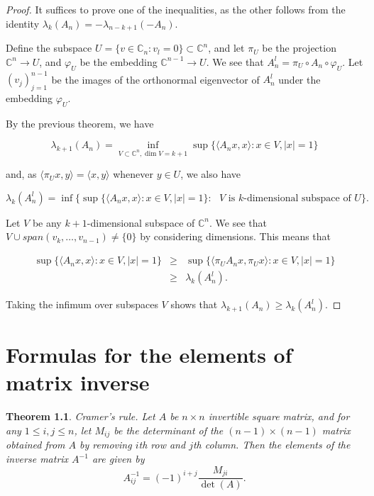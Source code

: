 \documentclass[12pt,a4paper,leqno]{report}
\newcommand{\C}{\mathbb{C}}
\theoremstyle{plain}
\newtheorem{theo}[equation]{Theorem}
\theoremstyle{definition}
\theoremstyle{remark}
\begin{document}
\begin{proof}
It suffices to prove one of the inequalities, as the other follows from the identity $\lambda_k(A_n) = -\lambda_{n-k+1}(-A_n)$.

Define the subspace $U = \{v \in \C_n : v_l=0\} \subset \C^n$, and let $\pi_U$ be the projection $\C^n \to U$, and $\varphi_U$ be the embedding $\C^{n-1} \to U$. We see that $A_n^l = \pi_U \circ A_n \circ \varphi_U$. Let $(v_j)_{j=1}^{n-1}$ be the images of the orthonormal eigenvector of $A_n^l$ under the embedding $\varphi_U$. 

By the previous theorem, we have

\begin{equation*}
\lambda_{k+1}(A_n) = \inf_{V \subset \C^n, \dim V = k+1}  \sup\{\langle A_nx,x \rangle : x \in V, |x|=1\}
\end{equation*}

and, as $\langle \pi_Ux,y \rangle = \langle x,y \rangle$ whenever $y \in U$, we also have

\begin{equation*}
\lambda_k(A_n^l) = \inf \{ \sup\{\langle A_nx,x \rangle : x \in V, |x|=1\} : \textrm{ $V$ is $k$-dimensional subspace of $U$} \}.
\end{equation*}

Let $V$ be any $k+1$-dimensional subspace of $\C^n$. We see that $V \cup span(v_k,\ldots ,v_{n-1}) \neq \{0\}$ by considering dimensions. This means that

\begin{eqnarray*}
\sup\{\langle A_nx,x \rangle : x \in V, |x|=1\} & \geq & \sup\{\langle \pi_UA_nx,\pi_Ux \rangle : x \in V, |x|=1\}\\
& \geq & \lambda_k(A_n^l).
\end{eqnarray*}

Taking the infimum over subspaces $V$ shows that  $\lambda_{k+1}(A_n) \geq \lambda_k(A_n^l)$.

\end{proof}

\chapter{Formulas for the elements of matrix inverse}

\begin{theo}
Cramer's rule. Let $A$ be $n \times n$ invertible square matrix, and for any $1\leq i,j \leq n$, let $M_{ij}$ be the determinant of the $(n-1) \times (n-1)$ matrix obtained from $A$ by removing $i$th row and $j$th column. Then the elements of the inverse matrix $A^{-1}$ are given by
\begin{equation*}
A_{ij}^{-1} = (-1)^{i+j}\frac{M_{ji}}{\det(A)}.
\end{equation*}
\end{theo}
\end{document}
